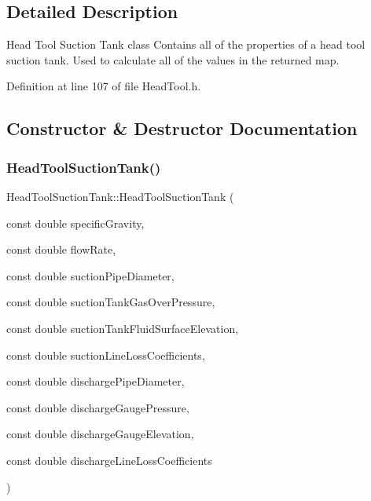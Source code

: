 \subsection{Detailed Description}
Head Tool Suction Tank class Contains all of the properties of a head tool suction tank. Used to calculate all of the values in the returned map. 

Definition at line 107 of file Head\+Tool.\+h.



\subsection{Constructor \& Destructor Documentation}
\mbox{\label{class_head_tool_suction_tank_a96579ecd414c723362db00cfeb24cd46}} 
\subsubsection{\texorpdfstring{Head\+Tool\+Suction\+Tank()}{HeadToolSuctionTank()}}
{\footnotesize\ttfamily Head\+Tool\+Suction\+Tank\+::\+Head\+Tool\+Suction\+Tank (\begin{DoxyParamCaption}\item[{const double}]{specific\+Gravity,  }\item[{const double}]{flow\+Rate,  }\item[{const double}]{suction\+Pipe\+Diameter,  }\item[{const double}]{suction\+Tank\+Gas\+Over\+Pressure,  }\item[{const double}]{suction\+Tank\+Fluid\+Surface\+Elevation,  }\item[{const double}]{suction\+Line\+Loss\+Coefficients,  }\item[{const double}]{discharge\+Pipe\+Diameter,  }\item[{const double}]{discharge\+Gauge\+Pressure,  }\item[{const double}]{discharge\+Gauge\+Elevation,  }\item[{const double}]{discharge\+Line\+Loss\+Coefficients }\end{DoxyParamCaption})\hspace{0.3cm}{\ttfamily [inline]}}


